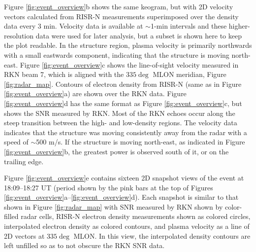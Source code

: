 Figure \ref{fig:event_overview}b shows the same keogram, but with 2D velocity vectors calculated from RISR-N measurements superimposed over the density data every 3 min.  Velocity data is available at \(\sim\)1-min intervals and these higher-resolution data were used for later analysis, but a subset is shown here to keep the plot readable. In the structure region, plasma velocity is primarily northwards with a small eastwards component, indicating that the structure is moving north-east.  Figure \ref{fig:event_overview}c shows the line-of-sight velocity measured in RKN beam 7, which is aligned with the \(335\deg\) MLON meridian, Figure \ref{fig:radar_map}. Contours of electron density from RISR-N (same as in Figure \ref{fig:event_overview}a) are shown over the RKN data. Figure \ref{fig:event_overview}d has the same format as Figure \ref{fig:event_overview}c, but shows the SNR measured by RKN. Most of the RKN echoes occur along the steep transition between the high- and low-density regions.  The velocity data indicates that the structure was moving consistently away from the radar with a speed of \(\sim\)500 m/s.  If the structure is moving north-east, as indicated in Figure \ref{fig:event_overview}b, the greatest power is observed south of it, or on the trailing edge.

Figure \ref{fig:event_overview}e contains sixteen 2D snapshot views of the event at 18:09--18:27 UT (period shown by the pink bars at the top of Figures \ref{fig:event_overview}a--\ref{fig:event_overview}d). Each snapshot is similar to that shown in Figure \ref{fig:radar_map} with SNR measured by RKN shown by color-filled radar cells, RISR-N electron density measurements shown as colored circles, interpolated electron density as colored contours, and plasma velocity as a line of 2D vectors at \(335\deg\) MLON. In this view, the interpolated density contours are left unfilled so as to not obscure the RKN SNR data.  

